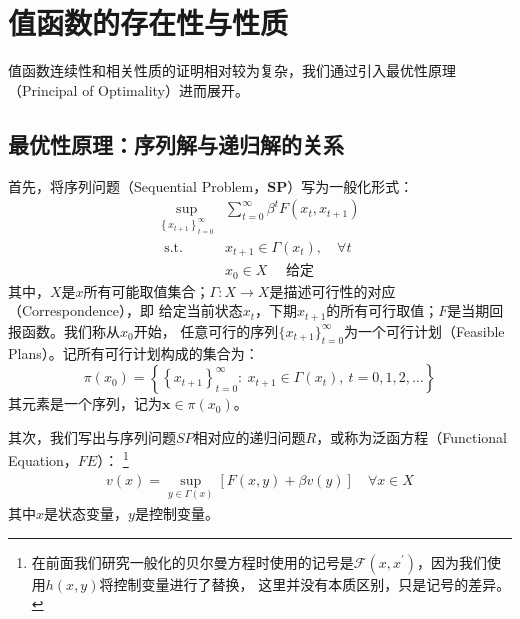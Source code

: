 
\section{值函数的存在性与性质} \label{sec-value-func-property}

值函数连续性和相关性质的证明相对较为复杂，我们通过引入最优性原理（Principal of Optimality）进而展开。


\subsection{最优性原理：序列解与递归解的关系}

首先，将序列问题（Sequential Problem，$\mathbf{SP}$）写为一般化形式：
\begin{equation*}
    \begin{aligned}
        \sup _{\left\{x_{t+1}\right\}_{t=0}^{\infty}} & \sum_{t=0}^{\infty} \beta^t F\left(x_t, x_{t+1}\right) \\
        \text { s.t. } & x_{t+1} \in \Gamma\left(x_t\right), \quad \forall t \\
        & x_0 \in X \quad \text { 给定 }
    \end{aligned}
    \tag{SP} \label{problem-sp}
\end{equation*}
其中，$X$是$x$所有可能取值集合；$\Gamma : X \rightarrow X$是描述可行性的对应（Correspondence），即
给定当前状态$x_t$，下期$x_{t+1}$的所有可行取值；$F$是当期回报函数。我们称从$x_0$开始，
任意可行的序列$\{x_{t+1}\}_{t=0}^{\infty}$为一个可行计划（Feasible Plans）。记所有可行计划构成的集合为：
\begin{equation*}
    \pi\left(x_0\right)=\left\{\left\{x_{t+1}\right\}_{t=0}^{\infty}: ~ x_{t+1} \in \Gamma\left(x_t\right), 
        ~ t=0,1,2, \ldots\right\}
\end{equation*}
其元素是一个序列，记为$\boldsymbol{x}\in\pi\left(x_0\right)$。

其次，我们写出与序列问题$SP$相对应的递归问题$R$，或称为泛函方程（Functional Equation，$FE$）：
\footnote{在前面我们研究一般化的贝尔曼方程时使用的记号是$\mathcal{F}(x,x^{\prime})$，因为我们使用$h(x,y)$将控制变量进行了替换，
这里并没有本质区别，只是记号的差异。}
\begin{equation}
    \begin{aligned}
        v(x)=\sup _{y \in \Gamma(x)}[F(x, y)+\beta v(y)] \quad \forall x \in X
    \end{aligned}
    \tag{FE} \label{problem-fe}
\end{equation}
其中$x$是状态变量，$y$是控制变量。

